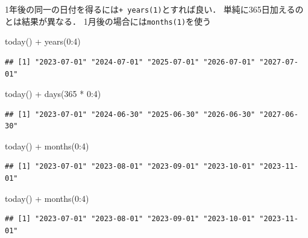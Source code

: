 \documentclass[
]{article}
\newenvironment{Shaded}{\begin{snugshade}}{\end{snugshade}}
\newcommand{\DecValTok}[1]{\textcolor[rgb]{0.00,0.00,0.81}{#1}}
\newcommand{\FunctionTok}[1]{\textcolor[rgb]{0.00,0.00,0.00}{#1}}
\newcommand{\NormalTok}[1]{#1}
\newcommand{\SpecialCharTok}[1]{\textcolor[rgb]{0.00,0.00,0.00}{#1}}
\begin{document}
1年後の同一の日付を得るには\texttt{+\ years(1)}とすれば良い．
単純に365日加えるのとは結果が異なる．
1月後の場合には\texttt{months(1)}を使う

\begin{Shaded}
\begin{Highlighting}[]
\FunctionTok{today}\NormalTok{() }\SpecialCharTok{+} \FunctionTok{years}\NormalTok{(}\DecValTok{0}\SpecialCharTok{:}\DecValTok{4}\NormalTok{)}
\end{Highlighting}
\end{Shaded}

\begin{verbatim}
## [1] "2023-07-01" "2024-07-01" "2025-07-01" "2026-07-01" "2027-07-01"
\end{verbatim}

\begin{Shaded}
\begin{Highlighting}[]
\FunctionTok{today}\NormalTok{() }\SpecialCharTok{+} \FunctionTok{days}\NormalTok{(}\DecValTok{365} \SpecialCharTok{*} \DecValTok{0}\SpecialCharTok{:}\DecValTok{4}\NormalTok{)}
\end{Highlighting}
\end{Shaded}

\begin{verbatim}
## [1] "2023-07-01" "2024-06-30" "2025-06-30" "2026-06-30" "2027-06-30"
\end{verbatim}

\begin{Shaded}
\begin{Highlighting}[]
\FunctionTok{today}\NormalTok{() }\SpecialCharTok{+} \FunctionTok{months}\NormalTok{(}\DecValTok{0}\SpecialCharTok{:}\DecValTok{4}\NormalTok{)}
\end{Highlighting}
\end{Shaded}

\begin{verbatim}
## [1] "2023-07-01" "2023-08-01" "2023-09-01" "2023-10-01" "2023-11-01"
\end{verbatim}

\begin{Shaded}
\begin{Highlighting}[]
\FunctionTok{today}\NormalTok{() }\SpecialCharTok{+} \FunctionTok{months}\NormalTok{(}\DecValTok{0}\SpecialCharTok{:}\DecValTok{4}\NormalTok{)}
\end{Highlighting}
\end{Shaded}

\begin{verbatim}
## [1] "2023-07-01" "2023-08-01" "2023-09-01" "2023-10-01" "2023-11-01"
\end{verbatim}
\end{document}

